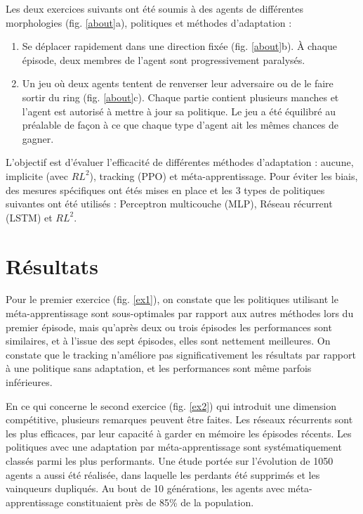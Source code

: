 \documentclass[a4paper,11pt]{article}
\begin{document}
    Les deux exercices suivants ont été soumis à des agents de différentes morphologies (fig. \ref{about}a), 
    politiques et méthodes d'adaptation :  

    \begin{enumerate}
      \vspace{-0.5em}
      \item{
        Se déplacer rapidement dans une direction fixée (fig. \ref{about}b). 
        À chaque épisode, deux membres de l'agent sont progressivement paralysés. 
      }
      \item{
        Un jeu où deux agents tentent de renverser leur adversaire ou de le faire sortir du ring (fig. \ref{about}c). 
        Chaque partie contient plusieurs manches et l'agent est autorisé à mettre à jour sa politique. Le jeu a été équilibré au préalable de façon à ce 
        que chaque type d'agent ait les mêmes chances de gagner.
      }
      \vspace{-0.5em}
    \end{enumerate}

    L'objectif est d'évaluer l'efficacité de différentes méthodes d'adaptation : 
    aucune, implicite (avec $RL^2$), tracking (PPO) et méta-apprentissage. Pour éviter les biais, 
    des mesures spécifiques ont étés mises en place et les 3 types de politiques suivantes ont été 
    utilisés : Perceptron multicouche (MLP), Réseau récurrent (LSTM) et $RL^2$.
    
    \section{Résultats}

    Pour le premier exercice (fig. \ref{ex1}), on constate que les politiques utilisant le méta-apprentissage sont 
    sous-optimales par rapport aux autres méthodes lors du premier épisode, mais qu'après deux ou trois 
    épisodes les performances sont similaires, et à l'issue des sept épisodes, elles sont nettement meilleures.
    On constate que le tracking n'améliore pas significativement les résultats par rapport à une politique sans adaptation, 
    et les performances sont même parfois inférieures.

    En ce qui concerne le second exercice (fig. \ref{ex2}) qui introduit une dimension compétitive, plusieurs remarques 
    peuvent être faites. Les réseaux récurrents sont les plus efficaces, par leur capacité à garder en mémoire les épisodes récents.
    Les politiques avec une adaptation par méta-apprentissage sont systématiquement classés parmi les plus performants. 
    Une étude portée sur l'évolution de 1050 agents a aussi été réalisée, dans laquelle les perdants été supprimés et les vainqueurs dupliqués. 
    Au bout de 10 générations, les agents avec méta-apprentissage constituaient près de 85\% de la population. 
    
\end{document}
